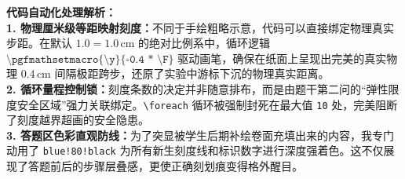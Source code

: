 \vspace{0.6cm}

{\small\color{blue!70!black}
\textbf{代码自动化处理解析：}\\
\textbf{1. 物理厘米级等距映射刻度：}不同于手绘粗略示意，代码可以直接绑定物理真实步距。在默认 $1.0 = 1.0\,\text{cm}$ 的绝对比例系中，循环逻辑 $\texttt{\textbackslash pgfmathsetmacro\{\textbackslash y\}\{-0.4 * \textbackslash F\}}$ 驱动画笔，确保在纸面上呈现出完美的真实物理 $0.4\,\text{cm}$ 间隔极距跨步，还原了实验中游标下沉的物理真实距离。\\
\textbf{2. 循环量程控制锁：}刻度条数的决定并非随意排布，而是由题干第二问的“弹性限度安全区域”强力关联绑定。\texttt{\textbackslash foreach} 循环被强制封死在最大值 \texttt{10} 处，完美阻断了刻度越界超画的安全隐患。\\
\textbf{3. 答题区色彩直观防线：}为了突显被学生后期补绘卷面充填出来的内容，我专门动用了 \texttt{blue!80!black} 为所有新生刻度线和标识数字进行深度强着色。这不仅展现了答题前后的步骤层叠感，更使正确刻划痕变得格外醒目。
}


